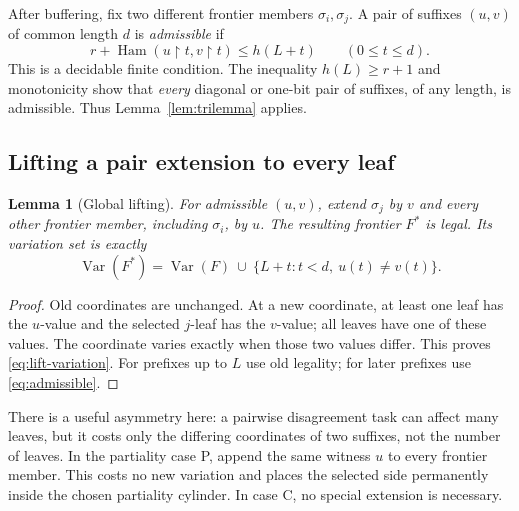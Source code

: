 \documentclass[11pt,a4paper]{article}
\newcommand{\Var}{\operatorname{Var}}
\newcommand{\Ham}{\operatorname{Ham}}
\newcommand{\restr}{\mathbin{\upharpoonright}}
\newtheorem{lemma}[theorem]{Lemma}
\theoremstyle{definition}\newtheorem{definition}[theorem]{Definition}
\theoremstyle{remark}\newtheorem{remark}[theorem]{Remark}
\begin{document}
After buffering, fix two different frontier members $\sigma_i,\sigma_j$.
A pair of suffixes $(u,v)$ of common length $d$ is \emph{admissible} if
\begin{equation}\label{eq:admissible}
 r+\Ham(u\restr t,v\restr t)\le h(L+t)
                         \qquad(0\le t\le d).
\end{equation}
This is a decidable finite condition. The inequality $h(L)\ge r+1$ and
monotonicity show that \emph{every} diagonal or one-bit pair of suffixes, of
any length, is admissible. Thus Lemma~\ref{lem:trilemma} applies.

\subsection{Lifting a pair extension to every leaf}
\begin{lemma}[Global lifting]\label{lem:lift}
For admissible $(u,v)$, extend $\sigma_j$ by $v$ and every other frontier
member, including $\sigma_i$, by $u$. The resulting frontier $F^*$ is legal.
Its variation set is exactly
\begin{equation}\label{eq:lift-variation}
 \Var(F^*)=\Var(F)\ \cup\ \{L+t:t<d,\ u(t)\ne v(t)\}.
\end{equation}
\end{lemma}
\begin{proof}
Old coordinates are unchanged. At a new coordinate, at least one leaf has
the $u$-value and the selected $j$-leaf has the $v$-value; all leaves have
one of these values. The coordinate varies exactly when those two values
differ. This proves \eqref{eq:lift-variation}. For prefixes up to $L$ use old
legality; for later prefixes use \eqref{eq:admissible}.
\end{proof}

There is a useful asymmetry here: a pairwise disagreement task can affect
many leaves, but it costs only the differing coordinates of two suffixes,
not the number of leaves. In the partiality case P, append the same witness
$u$ to every frontier member. This costs no new variation and places the
selected side permanently inside the chosen partiality cylinder. In case C,
no special extension is necessary.
\end{document}
